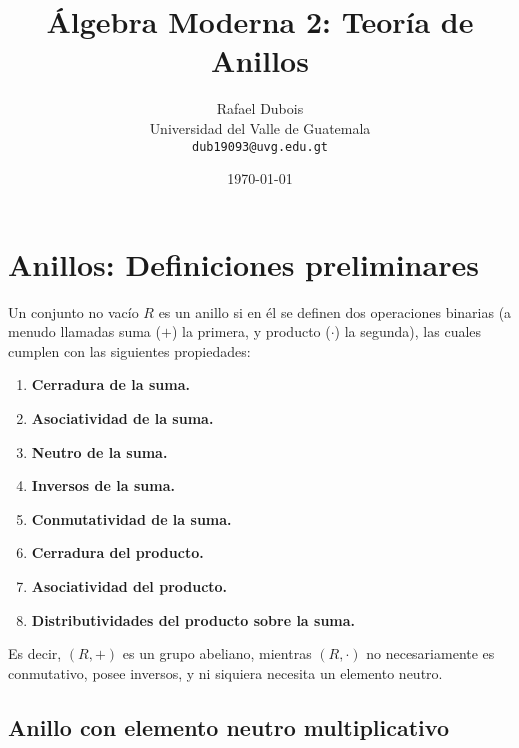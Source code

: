 \documentclass{article}
\title{Álgebra Moderna 2: Teoría de Anillos}
\author{\Large Rafael Dubois\\ Universidad del Valle de Guatemala \\ \texttt{dub19093@uvg.edu.gt}}
\date{\today}
\begin{document}
\maketitle
{}
\thispagestyle{fancy}

\section{Anillos: Definiciones preliminares}

Un conjunto no vacío $R$ es un anillo si en él se definen dos operaciones binarias (a menudo llamadas suma ($+$) la primera, y producto ($\cdot$) la segunda), las cuales cumplen con las siguientes propiedades:

\begin{enumerate}
\item \textbf{Cerradura de la suma.} 

\item \textbf{Asociatividad de la suma.} 

\item \textbf{Neutro de la suma.} 

\item \textbf{Inversos de la suma.}

\item \textbf{Conmutatividad de la suma.} 

\item \textbf{Cerradura del producto.} 

\item \textbf{Asociatividad del producto.} 

\item \textbf{Distributividades del producto sobre la suma.} 

\end{enumerate}

Es decir, $(R,+)$ es un grupo abeliano, mientras $(R,\cdot)$ no necesariamente es conmutativo, posee inversos, y ni siquiera necesita un elemento neutro.

\subsection*{\color{violet} Anillo con elemento neutro multiplicativo}
\end{document}
